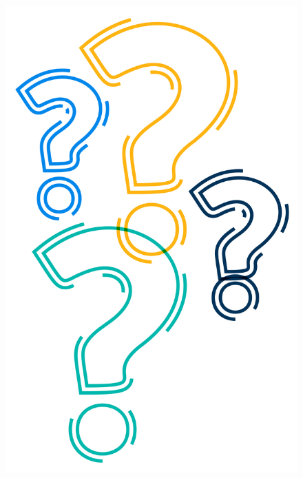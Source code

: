 \documentclass{beamer}
\begin{document}
\begin{frame}
\frametitle{}

\begin{figure}[H]
\centering
\includegraphics[scale=0.6]{question.jpg}
\label{fig:question}
\end{figure}
\end{frame}
\end{document}
